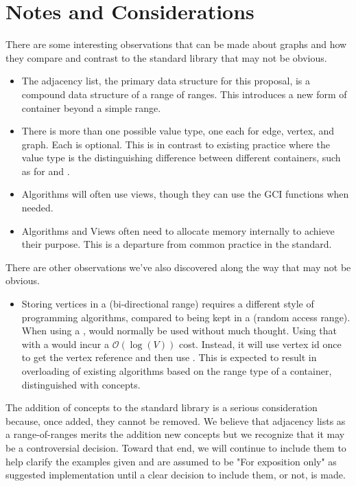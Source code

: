 \section{Notes and Considerations}
There are some interesting observations that can be made about graphs and how they compare and contrast to the 
standard library that may not be obvious.
\begin{itemize}
      \item The adjacency list, the primary data structure for this proposal, is a compound data structure of a
            range of ranges. This introduces a new form of container beyond a simple range.
      \item There is more than one possible value type, one each for edge, vertex, and graph. Each is optional.
            This is in contrast to existing practice where the value type is the distinguishing difference between
            different containers, such as for  and .
      \item Algorithms will often use views, though they can use the GCI functions when needed.
      \item Algorithms and Views often need to allocate memory internally to achieve their purpose. This is a departure from
            common practice in the standard.
\end{itemize}

There are other observations we've also discovered along the way that may not be obvious.
\begin{itemize}
      \item Storing vertices in a  (bi-directional range) requires a different style of programming 
            algorithms, compared to being kept in a  (random access range). When using a ,
             would normally be used without much thought. Using that with a  would
            incur a $\mathcal{O}(\log(V))$ cost. Instead, it will use vertex id once to get the vertex reference 
            and then use . This is expected to result in overloading of existing algorithms based on the
            range type of a container, distinguished with concepts.
\end{itemize}

The addition of concepts to the standard library is a serious consideration because, once added, they cannot 
be removed. We believe that adjacency lists as a range-of-ranges merits the addition new concepts but we recognize that it
may be a controversial decision. Toward that end, we will continue to include them to help clarify the examples given
and are assumed to be "For exposition only" as suggested implementation until a clear decision to include them, or not, 
is made.

